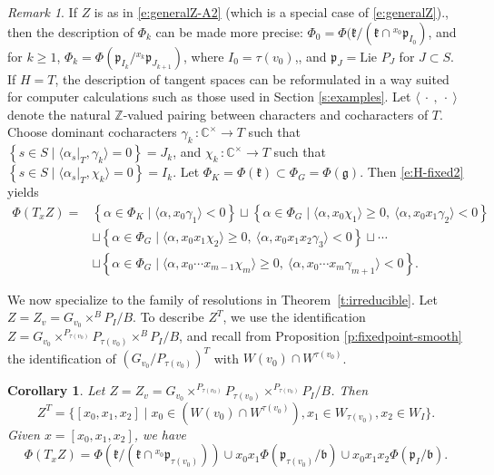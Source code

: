 \documentclass[11pt,letterpaper,reqno]{amsart}
\newcommand{\fb}{{\mathfrak b}}
\newcommand{\fg}{{\mathfrak g}}
\newcommand{\fk}{{\mathfrak k}}
\newcommand{\fp}{{\mathfrak p}}
\numberwithin{equation}{section}
\theoremstyle{plain}
\newtheorem{corollary}[theorem]{Corollary}
\theoremstyle{definition}
\theoremstyle{remark}
\newtheorem{remark}[theorem]{Remark}
\newcommand{\C}{\mathbb{C}}
\begin{document}
\begin{remark} \label{r:T-fixed-weights}
If $Z$ is as in \eqref{e:generalZ-A2} (which is a special case of \eqref{e:generalZ})., then the description of
$\Phi_k$ can be made more precise: $\Phi_0 = \Phi(\fk/(\fk \cap{}^{x_0}\fp_{I_0})$, and 
for $k \geq 1$, $\Phi_k = \Phi(\fp_{I_k}/{}^{x_k}\fp_{J_{k+1}})$, where $I_0 = \tau(v_0)$,, and
$\fp_J = \mbox{Lie }P_J$ for $J \subset S$.  If $H = T$, the description
of tangent spaces can be reformulated in a way suited for
computer calculations such as those used in Section \ref{s:examples}.
Let $\langle \ \cdot \ , \ \cdot \ \rangle$ denote the natural $\mathbb{Z}$-valued
pairing between characters and cocharacters of $T$.
Choose dominant cocharacters \(\gamma_k\,\colon\C^\times\to T\) 
such that \(\left\{s\in S\mid \langle\alpha_s\vert_T,\gamma_k\rangle=0\right\}=J_k\), and \(\chi_k\,\colon\C^\times\to T\) 
such that \(\left\{s\in S\mid \langle \alpha_s\vert_T,\chi_k\rangle=0\right\}=I_k\).
Let \(\Phi_K = \Phi( \fk) \subset \Phi_G = \Phi( \fg) \).  Then \eqref{e:H-fixed2} yields
\begin{equation}\label{e:atlas-weights}
\begin{split}
\Phi(T_xZ)=&\left\{\alpha\in\Phi_K\mid\langle\alpha, x_0\gamma_1\rangle<0\right\} \sqcup \left\{\alpha\in\Phi_G\mid\langle\alpha, x_0\chi_1\rangle\geq0,\ \langle\alpha,x_0x_1\gamma_2\rangle<0\right\}\\
&\sqcup \left\{\alpha\in\Phi_G\mid \langle\alpha, x_0x_1\chi_2\rangle\geq0,\ \langle\alpha, x_0x_1x_2\gamma_3\rangle<0\right\} \sqcup \cdots\\
&\sqcup \left\{\alpha\in\Phi_G\mid \langle\alpha, x_0\cdots x_{m-1}\chi_m\rangle\geq 0,\ \langle\alpha, x_0\cdots x_{m}\gamma_{m+1}\rangle<0\right\}.
\end{split}
\end{equation}
\end{remark}

We now specialize to the family of resolutions in Theorem~\ref{t:irreducible}.  Let $Z = Z_v = G_{v_0} \times^B P_I/B$.  To describe 
$Z^T$, we use the identification $Z = G_{v_0} \times^{P_{\tau(v_0)}} P_{\tau(v_0)} \times^B P_I/B$, and recall from
Proposition \ref{p:fixedpoint-smooth} the identification of $(G_{v_0}/P_{\tau(v_0)})^T$ with $W(v_0) \cap W^{\tau(v_0)}$.

\begin{corollary}\label{c:T-weights}
Let $Z  = Z_v =  G_{v_0} \times^{P_{\tau(v_0)}} P_{\tau(v_0)} \times^{P_{\tau(v_0)}} P_I/B$.  Then
$$
Z^T = \{ [x_0, x_1, x_2] \mid x_0 \in ( W(v_0) \cap W^{\tau(v_0)} ), x_1 \in W_{\tau(v_0)}, x_2 \in W_I \}.
$$
Given $x = [x_0, x_1, x_2]$, we have
$$
\Phi(T_x Z) = \Phi(\fk/(\fk\cap{}^{x_0}\fp_{\tau(v_0)}))\cup x_0 x_1\Phi(\fp_{\tau(v_0)}/\fb)\cup x_0 x_1 x_2 \Phi(\fp_I/\fb).
$$
\end{corollary}
\end{document}
